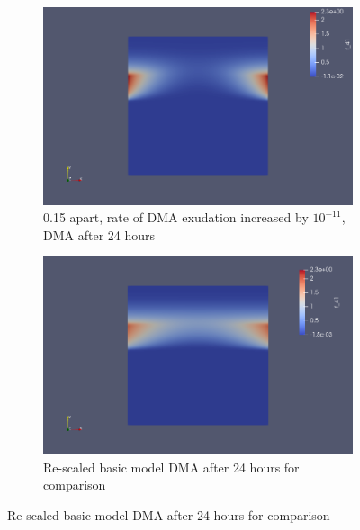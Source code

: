 \documentclass[11pt]{article}
\numberwithin{equation}{section}
\begin{document}
 \begin{figure}
     \centering
     \caption{Distance and DMA exudation increased}
     \begin{subfigure}[t]{0.45\textwidth}
     \includegraphics[width=\textwidth]{Figures/testpics/IncreasedBufferAndDistanceDMA24.png}
     \caption{0.15 apart, rate of DMA exudation increased by $10^{-11}$, DMA after 24 hours}
    \end{subfigure}
     \begin{subfigure}[t]{0.45\textwidth}
     \includegraphics[width=\textwidth]{Figures/testpics/BasictoComparetoDistance.png}
     \caption{Re-scaled basic model DMA after 24 hours for comparison}
     \end{subfigure}
 \end{figure}
\end{document}
